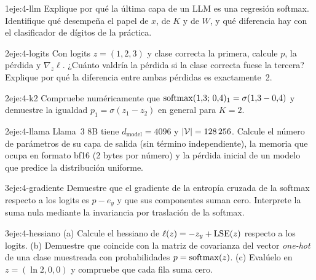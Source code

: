 \begin{ejercicio}{1}{eje:4-llm}
Explique por qué la última capa de un LLM es una regresión softmax. Identifique qué desempeña el papel de $x$, de $K$ y de $W$, y qué diferencia hay con el clasificador de dígitos de la práctica.
\end{ejercicio}

\begin{ejercicio}{2}{eje:4-logits}
Con logits $z=(1,2,3)$ y clase correcta la primera, calcule $p$, la pérdida y $\nabla_z\ell$. ¿Cuánto valdría la pérdida si la clase correcta fuese la tercera? Explique por qué la diferencia entre ambas pérdidas es exactamente~2.
\end{ejercicio}

\begin{ejercicio}{2}{eje:4-k2}
Compruebe numéricamente que $\operatorname{softmax}(1{,}3;\,0{,}4)_1=\sigma(1{,}3-0{,}4)$ y demuestre la igualdad $p_1=\sigma(z_1-z_2)$ en general para $K=2$.
\end{ejercicio}

\begin{ejercicio}{2}{eje:4-llama}
Llama~3 8B tiene $d_{\text{model}}=4096$ y $\lvert\mathcal{V}\rvert=128\,256$. Calcule el número de parámetros de su capa de salida (sin término independiente), la memoria que ocupa en formato bf16 (2 bytes por número) y la pérdida inicial de un modelo que predice la distribución uniforme.
\end{ejercicio}

\begin{ejercicio}{3}{eje:4-gradiente}
Demuestre que el gradiente de la entropía cruzada de la softmax respecto a los logits es $p-e_y$ y que sus componentes suman cero. Interprete la suma nula mediante la invariancia por traslación de la softmax.
\end{ejercicio}

\begin{ejercicio}{3}{eje:4-hessiano}
(a) Calcule el hessiano de $\ell(z)=-z_y+\operatorname{LSE}(z)$ respecto a los logits. (b) Demuestre que coincide con la matriz de covarianza del vector \emph{one-hot} de una clase muestreada con probabilidades $p=\operatorname{softmax}(z)$. (c) Evalúelo en $z=(\ln 2,0,0)$ y compruebe que cada fila suma cero.
\end{ejercicio}
